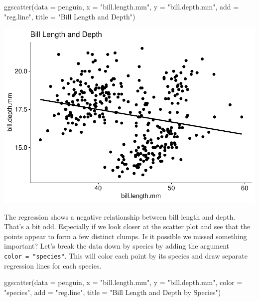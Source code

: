 \documentclass[
]{article}
\newenvironment{Shaded}{\begin{snugshade}}{\end{snugshade}}
\newcommand{\AttributeTok}[1]{\textcolor[rgb]{0.77,0.63,0.00}{#1}}
\newcommand{\FunctionTok}[1]{\textcolor[rgb]{0.00,0.00,0.00}{#1}}
\newcommand{\NormalTok}[1]{#1}
\newcommand{\StringTok}[1]{\textcolor[rgb]{0.31,0.60,0.02}{#1}}
\begin{document}
\begin{Shaded}
\begin{Highlighting}[]
\FunctionTok{ggscatter}\NormalTok{(}\AttributeTok{data =}\NormalTok{ penguin, }\AttributeTok{x =} \StringTok{"bill.length.mm"}\NormalTok{, }\AttributeTok{y =} \StringTok{"bill.depth.mm"}\NormalTok{,}
          \AttributeTok{add =} \StringTok{"reg.line"}\NormalTok{,}
          \AttributeTok{title =} \StringTok{"Bill Length and Depth"}\NormalTok{)}
\end{Highlighting}
\end{Shaded}

\includegraphics{Econ-Club-Example_files/figure-latex/Simpsons Paradox-1.pdf}

The regression shows a negative relationship between bill length and
depth. That's a bit odd. Especially if we look closer at the scatter
plot and see that the points appear to form a few distinct clumps. Is it
possible we missed something important? Let's break the data down by
species by adding the argument \texttt{color\ =\ "species"}. This will
color each point by its species and draw separate regression lines for
each species.

\begin{Shaded}
\begin{Highlighting}[]
\FunctionTok{ggscatter}\NormalTok{(}\AttributeTok{data =}\NormalTok{ penguin, }\AttributeTok{x =} \StringTok{"bill.length.mm"}\NormalTok{, }\AttributeTok{y =} \StringTok{"bill.depth.mm"}\NormalTok{, }\AttributeTok{color =} \StringTok{"species"}\NormalTok{,}
          \AttributeTok{add =} \StringTok{"reg.line"}\NormalTok{,}
          \AttributeTok{title =} \StringTok{"Bill Length and Depth by Species"}\NormalTok{)}
\end{Highlighting}
\end{Shaded}
\end{document}

